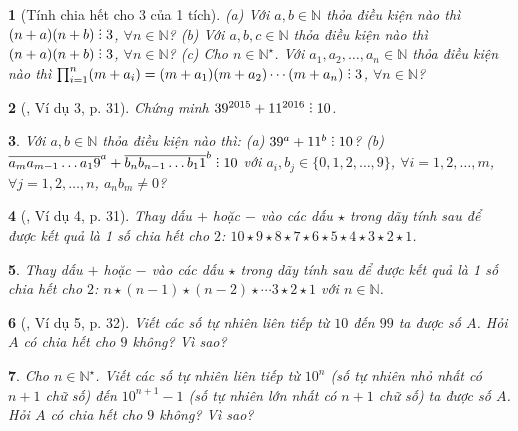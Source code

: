 \documentclass{article}
\newtheorem{baitoan}{}
\DeclareRobustCommand{\divby}{%
	\mathrel{\vbox{\baselineskip.65ex\lineskiplimit0pt\hbox{.}\hbox{.}\hbox{.}}}%
}
\begin{document}
\begin{baitoan}[Tính chia hết cho 3 của 1 tích]
	(a) Với $a,b\in\mathbb{N}$ thỏa điều kiện nào thì $(n + a)(n + b)\divby3$, $\forall n\in\mathbb{N}$? (b) Với $a,b,c\in\mathbb{N}$ thỏa điều kiện nào thì $(n + a)(n + b)\divby3$, $\forall n\in\mathbb{N}$? (c) Cho $n\in\mathbb{N}^\star$. Với $a_1,a_2,\ldots,a_n\in\mathbb{N}$ thỏa điều kiện nào thì $\prod_{i=1}^n (m + a_i) = (m + a_1)(m + a_2)\cdots(m + a_n)\divby3$, $\forall n\in\mathbb{N}$?
\end{baitoan}

\begin{baitoan}[\cite{Binh_boi_duong_Toan_6_tap_1}, Ví dụ 3, p. 31]
	Chứng minh $39^{2015} + 11^{2016}\divby10$.
\end{baitoan}

\begin{baitoan}
	Với $a,b\in\mathbb{N}$ thỏa điều kiện nào thì: (a) $39^a + 11^b\divby10$? (b) $\overline{a_ma_{m-1}\ldots a_19}^a + \overline{b_nb_{n-1}\ldots b_11}^b\divby10$ với $a_i,b_j\in\{0,1,2,\ldots,9\}$, $\forall i = 1,2,\ldots,m$, $\forall j = 1,2,\ldots,n$, $a_nb_m\ne0$?
\end{baitoan}

\begin{baitoan}[\cite{Binh_boi_duong_Toan_6_tap_1}, Ví dụ 4, p. 31]
	Thay dấu $+$ hoặc $-$ vào các dấu $\star$ trong dãy tính sau để được kết quả là 1 số chia hết cho $2$: $10\star9\star8\star7\star6\star5\star4\star3\star2\star1$.
\end{baitoan}

\begin{baitoan}
	Thay dấu $+$ hoặc $-$ vào các dấu $\star$ trong dãy tính sau để được kết quả là 1 số chia hết cho $2$: $n\star(n - 1)\star(n - 2)\star\cdots3\star2\star1$ với $n\in\mathbb{N}$.
\end{baitoan}

\begin{baitoan}[\cite{Binh_boi_duong_Toan_6_tap_1}, Ví dụ 5, p. 32]
	Viết các số tự nhiên liên tiếp từ $10$ đến $99$ ta được số $A$. Hỏi $A$ có chia hết cho $9$ không? Vì sao?
\end{baitoan}

\begin{baitoan}
	Cho $n\in\mathbb{N}^\star$. Viết các số tự nhiên liên tiếp từ $10^n$ (số tự nhiên nhỏ nhất có $n + 1$ chữ số) đến $10^{n+1} - 1$ (số tự nhiên lớn nhất có $n + 1$ chữ số) ta được số $A$. Hỏi $A$ có chia hết cho $9$ không? Vì sao?
\end{baitoan}
\end{document}
